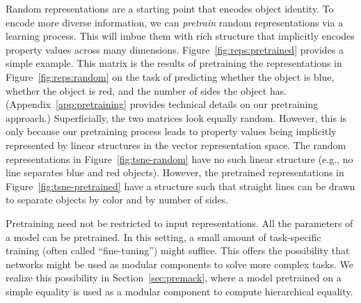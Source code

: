 \documentclass[9pt,twocolumn,twoside,lineno]{pnas-new}
\newcommand{\secref}[1]{Section~\ref{#1}}
\newcommand{\Figref}[1]{Figure~\ref{#1}}
\newcommand{\figref}[1]{Figure~\ref{#1}}
\newcommand{\Appref}[1]{Appendix~\ref{#1}}
\newcommand{\tech}[1]{\emph{#1}}
\begin{document}
Random representations are a starting point that encodes object identity. To encode more diverse information, we can \tech{pretrain} random representations via a learning process. This will imbue them with rich structure that implicitly encodes property values across many dimensions. \Figref{fig:reps:pretrained} provides a simple example. This matrix is the results of pretraining the representations in \figref{fig:reps:random} on the task of predicting whether the object is blue, whether the object is red, and the number of sides the object has. (\Appref{app:pretraining} provides technical details on our pretraining approach.) Superficially, the two matrices look equally random. However, this is only because our pretraining process leads to property values being implicitly represented by linear structures in the vector representation space.  The random representations in \figref{fig:tsne-random} have no such linear structure (e.g., no line separates blue and red objects).  However, the pretrained representations in \figref{fig:tsne-pretrained} have a structure such that straight lines can be drawn to separate objects by color and by number of sides.

Pretraining need not be restricted to input representations. All the parameters of a model can be pretrained. In this setting, a small amount of task-specific training (often called ``fine-tuning'') might suffice. This offers the possibility that networks might be used as modular components to solve more complex tasks. We realize this possibility in \secref{sec:premack}, where a model pretrained on a simple equality is used as a modular component to compute hierarchical equality.




\end{document}
